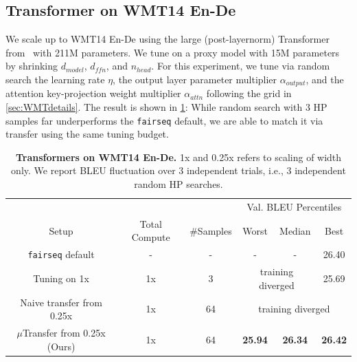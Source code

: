 \documentclass{article}
\theoremstyle{definition}
\begin{document}
\subsection{Transformer on WMT14 En-De}

We scale up to WMT14 En-De using the large (post-layernorm) Transformer from~\cite{DBLP:journals/corr/VaswaniSPUJGKP17} with 211M parameters.
We tune on a proxy model with 15M parameters by shrinking $d_{model}$, $d_{ffn}$, and $n_{head}$.
For this experiment, we tune via random search the learning rate $\eta$, the output layer parameter multiplier $\alpha_{output}$, and the attention key-projection weight multiplier $\alpha_{attn}$ following the grid in \cref{sec:WMTdetails}.
The result is shown in \cref{tab: wmt14_transfer}:
While random search with 3 HP samples far underperforms the \texttt{fairseq} default, we are able to match it via transfer using the same tuning budget.

\begin{table}[tph]
    \centering
    \small
    \caption[$\mu$Transfer results for Transformer on WMT14 En-De]{\textbf{Transformers on WMT14 En-De.}
     1x and 0.25x refers to scaling of width only.
     We report BLEU fluctuation over 3 independent trials, i.e., 3 independent random HP searches.}
    \begin{tabular}{cccccc}
        \toprule
        \multicolumn{3}{c}{}                                     & \multicolumn{3}{c}{Val. BLEU Percentiles}         \\
        Setup                    & Total Compute & \#Samples & Worst           & Median         & Best           \\ \midrule
        \texttt{fairseq}\citep{ott2019fairseq} default & -             & -             & -               & -              & 26.40          \\ \midrule
        Tuning on 1x             & 1x            & 3             & \multicolumn{2}{c}{training diverged}          & 25.69          \\
        Naive transfer from 0.25x          & 1x            & 64            & \multicolumn{3}{c}{training diverged} \\
        $\mu$Transfer from 0.25x (Ours)         & 1x            & 64            & \textbf{25.94}  & \textbf{26.34} & \textbf{26.42} \\ \bottomrule
                \end{tabular}
    \label{tab: wmt14_transfer}
\end{table}
\end{document}
